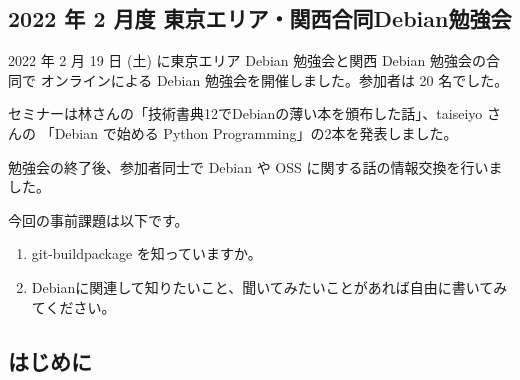 \documentclass[mingoth,a4paper]{jsarticle}
\begin{document}

\subsection{2022 年 2 月度 東京エリア・関西合同Debian勉強会}

2022 年 2 月 19 日 (土) に東京エリア Debian 勉強会と関西 Debian 勉強会の合同で
オンラインによる Debian 勉強会を開催しました。参加者は 20 名でした。

セミナーは林さんの「技術書典12でDebianの薄い本を頒布した話」、taiseiyo さんの
「Debian で始める Python Programming」の2本を発表しました。

勉強会の終了後、参加者同士で Debian や OSS に関する話の情報交換を行いました。



今回の事前課題は以下です。

\begin{enumerate}
  \item git-buildpackage を知っていますか。
  \item Debianに関連して知りたいこと、聞いてみたいことがあれば自由に書いてみてください。
\end{enumerate}


\begin{multicols}{2}
{\small

}
\end{multicols}

%
%
%
%




\subsection{はじめに}
\end{document}
